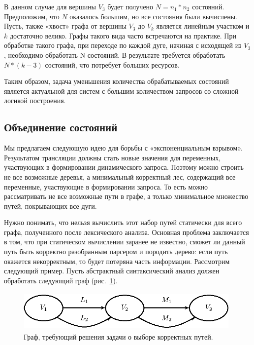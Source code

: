 \documentclass[a5paper]{article}
\begin{document}
В данном случае для вершины $V_3$ будет получено $N = n_1*n_2$ состояний. Предположим, что $N$ оказалось большим, но все состояния были вычислены. Пусть, также «хвост» графа от вершины $V_3$ до $V_k$ является линейным участком и $k$ достаточно велико. Графы такого вида часто встречаются на практике. При обработке такого графа, при переходе по каждой дуге, начиная с исходящей из $V_3$, необходимо обработать N состояний. В результате требуется обработать  $N * (k-3)$ состояний, что потребует больших ресурсов.

Таким образом, задача уменьшения количества обрабатываемых состояний является  актуальной для систем с большим количеством запросов со сложной логикой построения.

\subsection{Объединение состояний}

Мы предлагаем следующую идею для борьбы с «экспоненциальным взрывом». Результатом трансляции должны стать новые значения для переменных, участвующих в формировании динамического запроса. Поэтому можно строить не все возможные деревья, а минимальный корректный лес, содержащий все переменные, участвующие в формировании запроса. То есть можно рассматривать не все возможные пути в графе, а только минимальное множество путей, покрывающих все дуги.

Нужно понимать, что нельзя вычислить этот набор путей статически для всего графа, полученного после лексического анализа. Основная проблема заключается в том, что при статическом вычислении заранее не известно, сможет ли данный путь быть корректно разобранным парсером и породить дерево: если путь окажется некорректным, то будет потеряна часть информации.
Рассмотрим следующий пример. Пусть абстрактный синтаксический анализ должен обработать следующий граф (рис.~\ref{pic6}).


\begin{figure}
    \begin{center}
        \includegraphics[width=11cm,height=2cm]{graphs/paths.eps}
        \caption{Граф, требующий решения задачи о выборе корректных путей.}
        \label{pic6}
    \end{center}
\end{figure}
\end{document}
